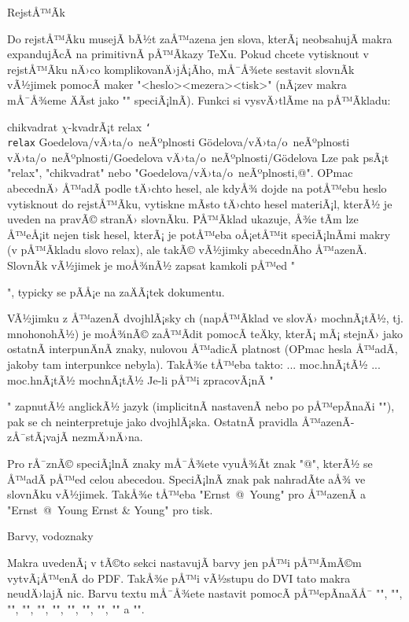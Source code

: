 \begtt
\sec RejstÅ™Ã­k
 \makeindex \endmulti
\endtt

Do rejstÅ™Ã­ku musejÃ­ bÃ½t zaÅ™azena jen  slova, kterÃ¡ neobsahujÃ­ makra
expandujÃ­cÃ­ na primitivnÃ­ pÅ™Ã­kazy \TeX{}u. Pokud chcete vytisknout v rejstÅ™Ã­ku
nÄ›co komplikovanÄ›jÅ¡Ã­ho, mÅ¯Å¾ete sestavit slovnÃ­k vÃ½jimek pomocÃ­ 
maker "\iis <heslo><mezera>{<tisk>}" 
(nÃ¡zev makra mÅ¯Å¾eme ÄÃ­st jako "\ii" speciÃ¡lnÃ­). 
Funkci si vysvÄ›tlÃ­me na pÅ™Ã­kladu:

\begtt
\iis chikvadrat {$\chi$-kvadrÃ¡t}
\iis relax {{\tt \char`\\relax}}
\iis Goedelova/vÄ›ta/o~neÃºplnosti {G\"odelova/vÄ›ta/o~neÃºplnosti}
\iis vÄ›ta/o~neÃºplnosti/Goedelova {vÄ›ta/o~neÃºplnosti/G\"odelova}
\endtt
%
Lze pak psÃ¡t "\ii relax", "\ii chikvadrat" nebo 
"\ii Goedelova/vÄ›ta/o~neÃºplnosti,@". 
OPmac abecednÄ› Å™adÃ­ podle tÄ›chto hesel, ale kdyÅ¾ dojde
na potÅ™ebu heslo vytisknout do rejstÅ™Ã­ku, vytiskne mÃ­sto tÄ›chto hesel
materiÃ¡l, 
kterÃ½ je uveden na pravÃ© stranÄ› slovnÃ­ku. 
PÅ™Ã­klad ukazuje, Å¾e tÃ­m lze
Å™eÅ¡it nejen tisk hesel, kterÃ¡ je potÅ™eba oÅ¡etÅ™it
speciÃ¡lnÃ­mi makry (v pÅ™Ã­kladu slovo relax), ale takÃ©
vÃ½jimky abecednÃ­ho Å™azenÃ­.
%
SlovnÃ­k vÃ½jimek je moÅ¾nÃ½ zapsat kamkoli pÅ™ed "\makeindex", 
typicky se pÃ­Å¡e na zaÄÃ¡tek dokumentu. 

VÃ½jimku z Å™azenÃ­ dvojhlÃ¡sky ch (napÅ™Ã­klad ve slovÄ› mochnÃ¡tÃ½, tj. mnohonohÃ½)
je moÅ¾nÃ© zaÅ™Ã­dit pomocÃ­ teÄky, kterÃ¡ mÃ¡ stejnÄ› jako ostatnÃ­ interpunÄnÃ­
znaky, nulovou Å™adicÃ­ platnost (OPmac hesla Å™adÃ­, jakoby tam interpunkce
nebyla). TakÅ¾e tÅ™eba takto:
\begtt
... \ii moc.hnÃ¡tÃ½ ...
\iis moc.hnÃ¡tÃ½ {mochnÃ¡tÃ½} 
\endtt
%
Je-li pÅ™i zpracovÃ¡nÃ­ "\makeindex" zapnutÃ½ anglickÃ½ jazyk (implicitnÃ­
nastavenÃ­ nebo po pÅ™epÃ­naÄi
"\ehyph"), pak se ch neinterpretuje jako dvojhlÃ¡ska. OstatnÃ­ pravidla Å™azenÃ­
zÅ¯stÃ¡vajÃ­ nezmÄ›nÄ›na.

Pro rÅ¯znÃ© speciÃ¡lnÃ­ znaky mÅ¯Å¾ete vyuÅ¾Ã­t znak "@", kterÃ½ se Å™adÃ­ pÅ™ed celou
abecedou. SpeciÃ¡lnÃ­ znak pak nahradÃ­te aÅ¾ ve slovnÃ­ku vÃ½jimek.
TakÅ¾e tÅ™eba "\ii Ernst~@~Young" pro Å™azenÃ­ a
"\iis Ernst~@~Young {Ernst \& Young}" pro tisk.


\sec Barvy, vodoznaky

Makra uvedenÃ¡ v tÃ©to sekci nastavujÃ­ barvy jen pÅ™i pÅ™Ã­mÃ©m
vytvÃ¡Å™enÃ­ do PDF. TakÅ¾e pÅ™i vÃ½stupu do DVI tato makra neudÄ›lajÃ­ nic.
%
Barvu textu mÅ¯Å¾ete nastavit pomocÃ­ pÅ™epÃ­naÄÅ¯ 
{\localcolor\Blue "\Blue"}, 
{\localcolor\Red "\Red"}, 
{\localcolor\Brown "\Brown"},
{\localcolor\Green "\Green"}, 
{\localcolor\Yellow "\Yellow"}, 
{\localcolor\Cyan "\Cyan"}, 
{\localcolor\Magenta "\Magenta"}, 
{"\White"}, 
{\localcolor\Grey "\Grey"}, 
{\localcolor\LightGrey "\LightGrey"} a 
{"\Black"}. 

